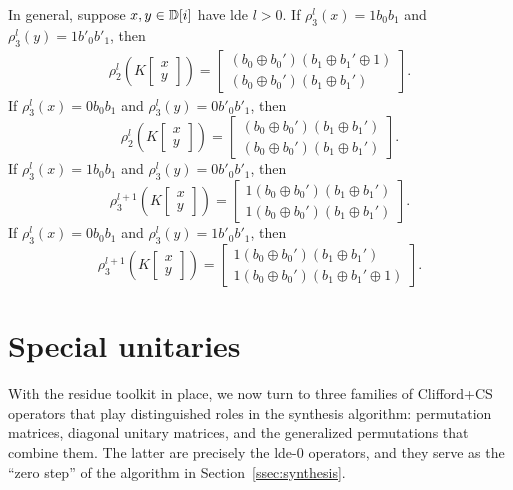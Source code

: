 \documentclass[reprint,amsmath,amssymb,aps,pra]{revtex4-2}
\begin{document}
In general, suppose $x, y \in {\mathbb D}[i]$ have lde $l > 0$. If
$\rho_3^l(x) = 1b_0 b_1$ and $\rho_3^l(y) = 1b'_0 b'_1$, then
\begin{align*}
  \rho_2^l(K \begin{bmatrix}
    x \\
    y
  \end{bmatrix})
  =
  \begin{bmatrix}
    (b_0\oplus b_0')(b_1 \oplus b_1' \oplus 1) \\
    (b_0\oplus b_0')(b_1 \oplus b_1')
  \end{bmatrix}.
\end{align*}
If $\rho_3^l(x) = 0b_0 b_1$ and $\rho_3^l(y) = 0b'_0 b'_1$, then
\[
  \rho_2^l(K \begin{bmatrix}
    x \\
    y
  \end{bmatrix})
  =
  \begin{bmatrix}
    (b_0\oplus b_0')(b_1 \oplus b_1') \\
    (b_0\oplus b_0')(b_1 \oplus b_1')
  \end{bmatrix}.
\]
If $\rho_3^l(x) = 1b_0 b_1$ and $\rho_3^l(y) = 0b'_0 b'_1$, then
\[
  \rho_3^{l+1}(K \begin{bmatrix}
    x \\
    y
  \end{bmatrix})
  =
  \begin{bmatrix}
    1(b_0\oplus b_0')(b_1 \oplus b_1') \\
    1(b_0\oplus b_0')(b_1 \oplus b_1')
  \end{bmatrix}.
\]
If $\rho_3^l(x) = 0b_0 b_1$ and $\rho_3^l(y) = 1b'_0 b'_1$, then
\[
  \rho_3^{l+1}(K \begin{bmatrix}
    x \\
    y
  \end{bmatrix})
  =
  \begin{bmatrix}
    1(b_0\oplus b_0')(b_1 \oplus b_1') \\
    1(b_0\oplus b_0')(b_1 \oplus b_1' \oplus 1)
  \end{bmatrix}.
\]




\section{Special unitaries}

With the residue toolkit in place, we now turn to three families of
Clifford+CS operators that play distinguished roles in the synthesis
algorithm: permutation matrices, diagonal unitary matrices, and the
generalized permutations that combine them. The latter are precisely
the lde-$0$ operators, and they serve as the ``zero step'' of the
algorithm in Section~\ref{ssec:synthesis}.
\end{document}
